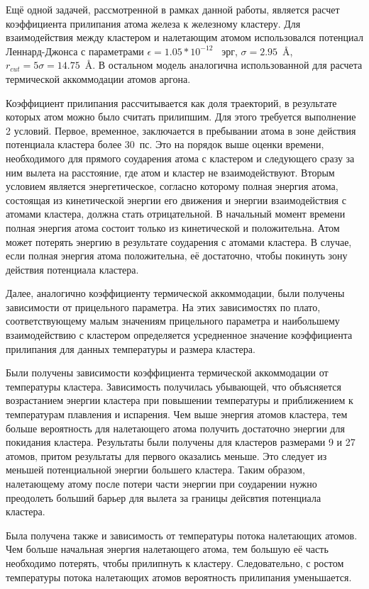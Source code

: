 Ещё одной задачей, рассмотренной в рамках данной работы, является расчет коэффициента прилипания атома железа к железному кластеру. Для взаимодействия между кластером и налетающим атомом использовался потенциал Леннард-Джонса с параметрами $\epsilon = 1.05*10^{-12}$ ~эрг, $\sigma = 2.95$~\AA, $r_{cut} = 5 \sigma = 14.75$~\AA. В остальном модель аналогична использованной для расчета термической аккоммодации атомов аргона. 

Коэффициент прилипания рассчитывается как доля траекторий, в результате которых атом можно было считать прилипшим. Для этого требуется выполнение 2 условий. Первое, временное, заключается в пребывании атома в зоне действия потенциала кластера более 30~пс. Это на порядок выше оценки времени, необходимого для прямого соударения атома с кластером и следующего сразу за ним вылета на расстояние, где атом и кластер не взаимодействуют. Вторым условием является энергетическое, согласно которому полная энергия атома, состоящая из кинетической энергии его движения и энергии взаимодействия с атомами кластера, должна стать отрицательной. В начальный момент времени полная энергия атома состоит только из кинетической и положительна. Атом может потерять энергию в результате соударения с атомами кластера. В случае, если полная энергия атома положительна, её достаточно, чтобы покинуть зону действия потенциала кластера.   

Далее, аналогично коэффициенту термической аккоммодации, были получены зависимости от прицельного параметра. На этих зависимостях по плато, соответствующему малым значениям прицельного параметра и наибольшему взаимодействию с кластером определяется усредненное значение коэффициента прилипания для данных температуры и размера кластера. 

Были получены зависимости коэффициента термической аккоммодации от температуры кластера. Зависимость получилась убывающей, что объясняется возрастанием энергии кластера при повышении температуры и приближением к температурам плавления и испарения.  Чем выше энергия атомов кластера, тем больше вероятность для налетающего атома получить достаточно энергии для покидания кластера. Результаты были получены для кластеров размерами 9 и 27 атомов, притом результаты для первого оказались меньше. Это следует из меньшей потенциальной энергии большего кластера. Таким образом, налетающему атому после потери части энергии при соударении нужно преодолеть больший барьер для вылета за границы дейсвтия потенциала кластера.

Была получена также и зависимость от температуры потока налетающих атомов. Чем больше начальная энергия налетающего атома, тем большую её часть необходимо потерять, чтобы прилипнуть к кластеру. Следовательно, с ростом температуры потока налетающих атомов вероятность прилипания уменьшается.

